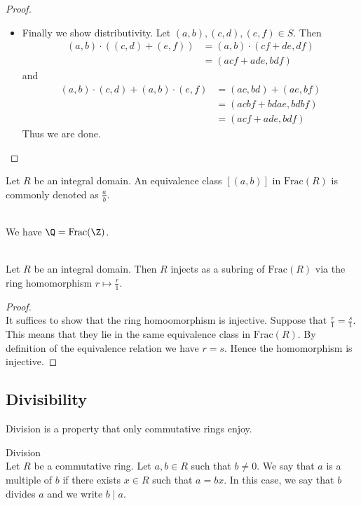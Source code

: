 \documentclass[a4paper]{article}
\begin{document}
\begin{prp}{}{}
\begin{proof}
\begin{itemize}
\item Finally we show distributivity. Let $(a,b),(c,d),(e,f)\in S$. Then 
\begin{align*}
(a,b)\cdot((c,d)+(e,f))&=(a,b)\cdot(cf+de,df)\\
&=(acf+ade,bdf)
\end{align*}
and 
\begin{align*}
(a,b)\cdot(c,d)+(a,b)\cdot(e,f)&=(ac,bd)+(ae,bf)\\
&=(acbf+bdae,bdbf)\\
&=(acf+ade,bdf)\tag{equivalence relation}
\end{align*}
Thus we are done. 
\end{itemize}
\end{proof}
\end{prp}

Let $R$ be an integral domain. An equivalence class $[(a,b)]$ in $\text{Frac}(R)$ is commonly denoted as $\frac{a}{b}$. 

\begin{eg}{}{}\\
We have $\Q=\text{Frac}(\Z)$. 
\end{eg}

\begin{lmm}{}{}\\
Let $R$ be an integral domain. Then $R$ injects as a subring of $\text{Frac}(R)$ via the ring homomorphism $r\mapsto\frac{r}{1}$. 
\begin{proof}\\
It suffices to show that the ring homoomorphism is injective. Suppose that $\frac{r}{1}=\frac{s}{1}$. This means that they lie in the same equivalence class in $\text{Frac}(R)$. By definition of the equivalence relation we have $r=s$. Hence the homomorphism is injective. 
\end{proof}
\end{lmm}

\subsection{Divisibility}
Division is a property that only commutative rings enjoy. 

\begin{defn}{Division}{}\\
Let $R$ be a commutative ring. Let $a,b\in R$ such that $b\neq 0$. We say that $a$ is a multiple of $b$ if there exists $x\in R$ such that $a=bx$. In this case, we say that $b$ divides $a$ and we write $b\;|\;a$. 
\end{defn}
\end{document}
